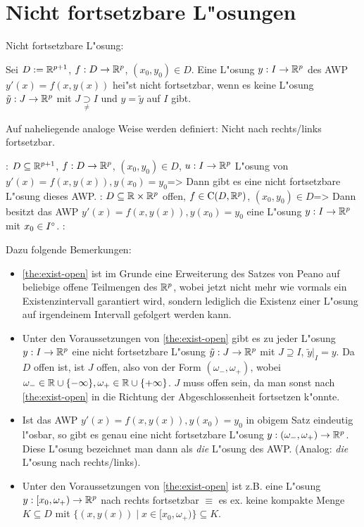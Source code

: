 \section{Nicht fortsetzbare L"osungen}
 Nicht fortsetzbare L"osung:{
  Sei $D:=\mathbb R^{p+1}$, $f:D\to\mathbb R^p$, $(x_0,y_0)\in D$. Eine L"osung
  $y:I\to\mathbb R^p$ des AWP $y'(x)=f(x,y(x))$ hei"st nicht fortsetzbar, wenn
  es keine L"osung $\tilde y:J\to\mathbb R^p$ mit $J\underset \neq \supset I$ und
  $y=\tilde y$ auf $I$ gibt.
  
  Auf naheliegende analoge Weise werden definiert: Nicht nach rechts/links 
  fortsetzbar.
  }
\theorem: $D\subseteq\mathbb R^{p+1}$, $f:D\to\mathbb R^p$, $(x_0,y_0)\in D$,
  $u:I\to\mathbb R^p$ L"osung von $y'(x)=f(x,y(x)),y(x_0)=y_0$=>{
  \label{the:fortsetzbar}
  Dann gibt es eine nicht fortsetzbare L"osung dieses AWP.
  }
\theorem: $D\subseteq\mathbb R\times\mathbb R^p$ offen, $f\in{\rm C}(D,\mathbb R^p)$,
  $(x_0,y_0)\in D$=>{
  \label{the:exist-open}
  Dann besitzt das AWP $y'(x)=f(x,y(x)),y(x_0)=y_0$ eine L"osung 
  $y:I\to\mathbb R^p$ mit $x_0\in {I}^\circ$.
  }
\remark:{
  Dazu folgende Bemerkungen:
  \begin{itemize}
    \item \ref{the:exist-open} ist im Grunde eine Erweiterung des
      Satzes von Peano auf beliebige offene Teilmengen des $\mathbb R^p$,
      wobei jetzt nicht mehr wie vormals ein Existenzintervall garantiert
      wird, sondern lediglich die Existenz einer L"osung auf irgendeinem
      Intervall gefolgert werden kann.
    \item Unter den Voraussetzungen von \ref{the:exist-open} gibt es zu
      jeder L"osung $y:I\to\mathbb R^p$ eine nicht fortsetzbare L"osung
      $\tilde y:J\to\mathbb R^p$ mit $J\supseteq I$, $\tilde y|_I=y$. 
      Da $D$ offen ist, ist $J$ offen, also von der Form 
      $(\omega_-,\omega_+)$, wobei 
      $\omega_-\in\mathbb R\cup\{-\infty\},\omega_+\in\mathbb R\cup\{+\infty\}$.
      $J$ muss offen sein, da man sonst nach \ref{the:exist-open} in
      die Richtung der Abgeschlossenheit fortsetzen k"onnte.
    \item Ist das AWP $y'(x)=f(x,y(x)),y(x_0)=y_0$ in obigem Satz 
      eindeutig l"osbar, so gibt es genau eine nicht fortsetzbare
      L"osung $y:(\omega_-,\omega_+)\to\mathbb R^p$. Diese L"osung bezeichnet
      man dann als \emph{die} L"osung des AWP. 
      (Analog: \emph{die} L"osung nach rechts/links).
    \item Unter den Voraussetzungen von \ref{the:exist-open} ist z.B.
      eine L"osung $y:[x_0,\omega_+)\to\mathbb R^p$ nach rechts fortsetzbar
      $\equiv$ es ex. keine kompakte Menge $K\subseteq D$ mit
      $\{(x,y(x))\mid x\in[x_0,\omega_+)\}\subseteq K$.
    \end{itemize}
  }
